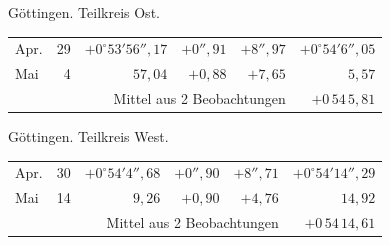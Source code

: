 \noindent\begin{minipage}[t]{.495\textwidth}\centering Göttingen. Teilkreis Ost.\par\smallskip
{\scriptsize\setlength{\tabcolsep}{1pt}\renewcommand{\arraystretch}{1.2}\begin{tabular}{lr|r|r|r|r|}
Apr.&29&$+0^\circ53'56''{,}17$&$+0''{,}91$&$+8''{,}97$&$+0^\circ54'6''{,}05$\\
Mai&4&$57{,}04$&$+0{,}88$&$+7{,}65$&$5{,}57$\\
\cline{6-6}\multicolumn{5}{r}{Mittel aus 2 Beobachtungen}&$+0\,54\,5{,}81$
\end{tabular}}\end{minipage}\hfill\begin{minipage}[t]{.495\textwidth}\centering Göttingen. Teilkreis West.\par\smallskip
{\scriptsize\setlength{\tabcolsep}{1pt}\renewcommand{\arraystretch}{1.2}\begin{tabular}{lr|r|r|r|r}
Apr.&30&$+0^\circ54'4''{,}68$&$+0''{,}90$&$+8''{,}71$&$+0^\circ54'14''{,}29$\\
Mai&14&$9{,}26$&$+0{,}90$&$+4{,}76$&$14{,}92$\\
\cline{6-6}\multicolumn{5}{r}{Mittel aus 2 Beobachtungen}&$+0\,54\,14{,}61$
\end{tabular}}\end{minipage}
\par\vspace{4mm}

